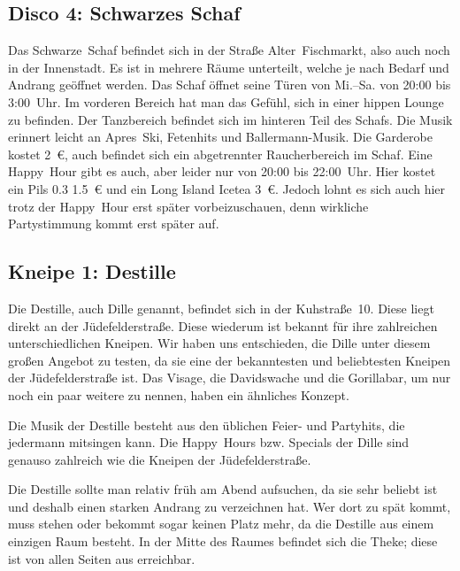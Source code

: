 \begin{multicols*}{2}
\begin{center}
\end{center}

\subsection*{Disco 4: Schwarzes Schaf}
Das Schwarze~Schaf befindet sich in der Straße Alter~Fischmarkt, also auch noch in der Innenstadt. Es ist in mehrere Räume unterteilt, welche je nach Bedarf und Andrang geöffnet werden. Das Schaf öffnet seine Türen von Mi.--Sa. von 20:00 bis 3:00~Uhr. Im vorderen Bereich hat man das Gefühl, sich in einer hippen Lounge zu befinden. Der Tanzbereich befindet sich im hinteren Teil des Schafs. Die Musik erinnert leicht an Apres~Ski, Fetenhits und Ballermann-Musik. Die Garderobe kostet \SI{2}{\euro}, auch befindet sich ein abgetrennter Raucherbereich im Schaf. Eine Happy~Hour gibt es auch, aber leider nur von 20:00 bis 22:00~Uhr. Hier kostet ein Pils \num{0,3} \SI{1,5}{\euro} und ein Long Island Icetea \SI{3}{\euro}. Jedoch lohnt es sich auch hier trotz der Happy~Hour erst später vorbeizuschauen, denn wirkliche Partystimmung kommt erst später auf.

\begin{center}
\end{center}

\subsection*{Kneipe 1: Destille}
Die Destille, auch Dille genannt, befindet sich in der Kuhstraße~10. Diese liegt direkt an der Jüdefelderstraße. Diese wiederum ist bekannt für ihre zahlreichen unterschiedlichen Kneipen. Wir haben uns entschieden, die Dille unter diesem großen Angebot zu testen, da sie eine der bekanntesten und beliebtesten Kneipen der Jüdefelderstraße ist. Das Visage, die Davidswache und die Gorillabar, um nur noch ein paar weitere zu nennen, haben ein ähnliches Konzept.

Die Musik der Destille besteht aus den üblichen Feier- und Partyhits, die jedermann mitsingen kann. Die Happy~Hours bzw. Specials der Dille sind genauso zahlreich wie die Kneipen der Jüdefelderstraße.

Die Destille sollte man relativ früh am Abend aufsuchen, da sie sehr beliebt ist und deshalb einen starken Andrang zu verzeichnen hat. Wer dort zu spät kommt, muss stehen oder bekommt sogar keinen Platz mehr, da die Destille aus einem einzigen Raum besteht. In der Mitte des Raumes befindet sich die Theke; diese ist von allen Seiten aus erreichbar.


\end{multicols*}

